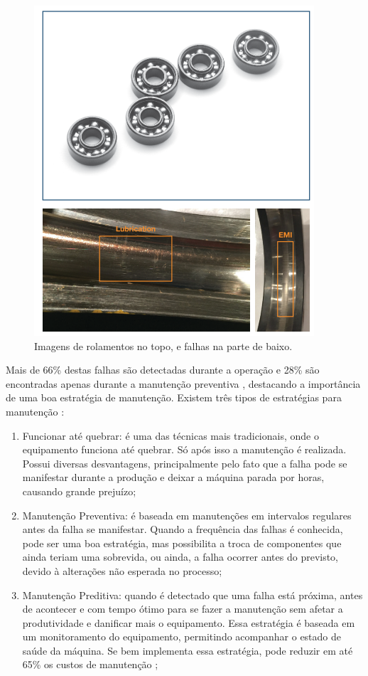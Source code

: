 \begin{figure}[H]
    \caption{Imagens de rolamentos no topo, e falhas na parte de baixo.}
    \begin{center}
        \includegraphics[scale=.5]{referencial/img/bearing_analog_p3.png}
    \end{center}
    \label{fig:bearing_analog_p3}
\end{figure}

Mais de 66\% destas falhas são detectadas durante a operação e 28\% são encontradas apenas durante a manutenção 
preventiva \cite{Gorbounov2018}, destacando a importância de uma boa estratégia de manutenção. Existem três tipos de estratégias 
para manutenção \cite{Wu2013}:  

\begin{enumerate}
    \item Funcionar até quebrar: é uma das técnicas mais tradicionais, onde o equipamento funciona até quebrar. Só após isso a
manutenção é realizada. Possui diversas desvantagens, principalmente pelo fato que a falha pode se manifestar durante a produção e
deixar a máquina parada por horas, causando grande prejuízo;
    \item Manutenção Preventiva: é baseada em manutenções em intervalos regulares antes da falha se manifestar. Quando a frequência das
falhas é conhecida, pode ser uma boa estratégia, mas possibilita a troca de componentes que ainda teriam uma sobrevida, ou ainda, a falha
ocorrer antes do previsto, devido à alterações não esperada no processo;
    \item Manutenção Preditiva: quando é detectado que uma falha está próxima, antes de acontecer e com tempo ótimo para se fazer a 
manutenção sem afetar a produtividade e danificar mais o equipamento. Essa estratégia é baseada em um monitoramento do equipamento,
permitindo acompanhar o estado de saúde da máquina. Se bem implementa essa estratégia, pode reduzir em até 65\% os custos de manutenção
\cite{Wu2013};
\end{enumerate}

